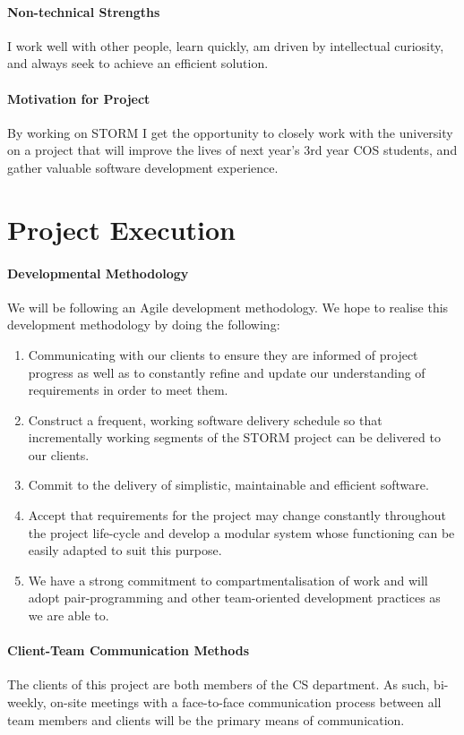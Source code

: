 \documentclass[12pt]{article}
\begin{document}
\paragraph{Non-technical Strengths}
I work well with other people, learn quickly, am driven by intellectual curiosity, and always seek to achieve an efficient solution.
\paragraph{Motivation for Project}
By working on STORM I get the opportunity to closely work with the university on a project that will improve the lives of next year's 3rd year COS students, and gather valuable software development experience.

\section{Project Execution}
\paragraph{Developmental Methodology}
We will be following an Agile development methodology. We hope to realise this development methodology by doing the following:
\begin{enumerate}
\item Communicating with our clients to ensure they are informed of project progress as well as to constantly refine and update our understanding of requirements in order to meet them.
\item Construct a frequent, working software delivery schedule so that incrementally working segments of the STORM project can be delivered to our clients.
\item Commit to the delivery of simplistic, maintainable and efficient software.
\item Accept that requirements for the project may change constantly throughout the project life-cycle and develop a modular system whose functioning can be easily adapted to suit this purpose.
\item We have a strong commitment to compartmentalisation of work and will adopt pair-programming and other team-oriented development practices as we are able to.
\end{enumerate}

\paragraph{Client-Team Communication Methods}
The clients of this project are both members of the CS department. As such, bi-weekly, on-site meetings with a face-to-face communication process between all team members and clients will be the primary means of communication.
\end{document}
